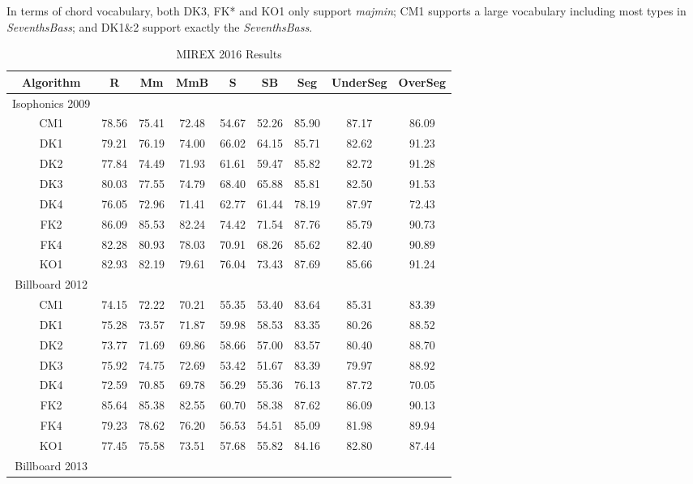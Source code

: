 In terms of chord vocabulary, both DK3, FK* and KO1 only support \textit{majmin}; CM1 supports a large vocabulary including most types in \textit{SeventhsBass}; and DK1\&2 support exactly the \textit{SeventhsBass}.
\thispagestyle{plain}
\begin{table*}[htbp]
\centering
\scriptsize
\caption{MIREX 2016 Results}
\label{tab:3-mirex2016}
\begin{tabular}{|c|c|c|c|c|c|c|c|c|}\hline
Algorithm & R & Mm & MmB & S & SB & Seg & UnderSeg & OverSeg \\ \hline
Isophonics 2009\\ \hline
CM1 & 78.56 & 75.41 & 72.48 & 54.67 & 52.26 & 85.90 & 87.17 & 86.09\\ \hline
DK1 & 79.21 & 76.19 & 74.00 & 66.02 & 64.15 & 85.71 & 82.62 & 91.23\\ \hline
DK2 & 77.84 & 74.49 & 71.93 & 61.61 & 59.47 & 85.82 & 82.72 & 91.28\\ \hline
DK3 & 80.03 & 77.55 & 74.79 & 68.40 & 65.88 & 85.81 & 82.50 & 91.53\\ \hline
DK4 & 76.05 & 72.96 & 71.41 & 62.77 & 61.44 & 78.19 & 87.97 & 72.43\\ \hline
FK2 & 86.09 & 85.53 & 82.24 & 74.42 & 71.54 & 87.76 & 85.79 & 90.73\\ \hline
FK4 & 82.28 & 80.93 & 78.03 & 70.91 & 68.26 & 85.62 & 82.40 & 90.89\\ \hline
KO1 & 82.93 & 82.19 & 79.61 & 76.04 & 73.43 & 87.69 & 85.66 & 91.24\\ \hline
Billboard 2012 \\ \hline
CM1 & 74.15 & 72.22 & 70.21 & 55.35 & 53.40 & 83.64 & 85.31 & 83.39\\ \hline
DK1 & 75.28 & 73.57 & 71.87 & 59.98 & 58.53 & 83.35 & 80.26 & 88.52\\ \hline
DK2 & 73.77 & 71.69 & 69.86 & 58.66 & 57.00 & 83.57 & 80.40 & 88.70\\ \hline
DK3 & 75.92 & 74.75 & 72.69 & 53.42 & 51.67 & 83.39 & 79.97 & 88.92\\ \hline
DK4 & 72.59 & 70.85 & 69.78 & 56.29 & 55.36 & 76.13 & 87.72 & 70.05\\ \hline
FK2 & 85.64 & 85.38 & 82.55 & 60.70 & 58.38 & 87.62 & 86.09 & 90.13\\ \hline
FK4 & 79.23 & 78.62 & 76.20 & 56.53 & 54.51 & 85.09 & 81.98 & 89.94\\ \hline
KO1 & 77.45 & 75.58 & 73.51 & 57.68 & 55.82 & 84.16 & 82.80 & 87.44\\ \hline
Billboard 2013 \\ \hline

\end{tabular}
\end{table*}
